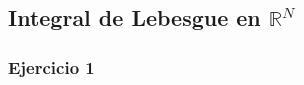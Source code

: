 \documentclass[11pt,spanish]{article} %
\begin{document}
\subsection{Integral de Lebesgue en $\mathbb{R}^N$}
	\subsubsection{Ejercicio 1}
	
	
\end{document}
